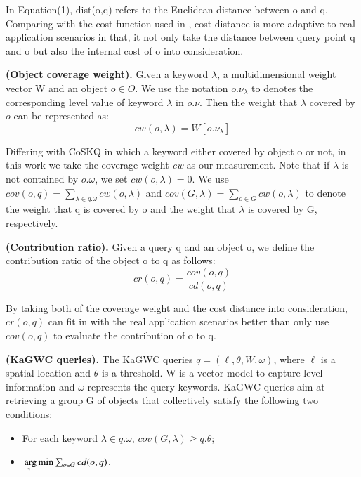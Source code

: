 In Equation(1), dist(o,q) refers to the Euclidean distance between o and q. Comparing with the cost function used in \cite{cao2011collective, long2013collective}, cost distance is more adaptive to real application scenarios in that, it not only take the distance between query point q and o but also the internal cost of o into consideration.

\noindent
\begin{definition}
    \textbf{(Object coverage weight).} Given a keyword $\lambda$, a multidimensional weight vector W and an object $o\in O$. We use the notation $o.\nu_\lambda$ to denotes the corresponding level value of keyword $\lambda$ in $o.\nu$. Then the weight that $\lambda$ covered by $o$ can be represented as:
    \begin{equation}
        cw(o,\lambda)=W[o.\nu_\lambda]
    \end{equation}
\end{definition}

Differing with CoSKQ in which a keyword either covered by object o or not, in this work we take the coverage weight \textit{cw} as our measurement. Note that if $\lambda$ is not contained by $o.\omega$, we set $cw(o,\lambda)=0$. We use $cov(o,q)=\sum_{\lambda \in q.\omega}cw(o,\lambda)$ and $cov(G,\lambda)=\sum_{o \in G}cw(o,\lambda)$ to denote the weight that q is covered by o and the weight that $\lambda$ is covered by G, respectively.

\noindent
\begin{definition}
    \textbf{(Contribution ratio).} Given a query q and an object o, we define the contribution ratio of the object o to q as follows:
    \begin{equation}
        cr(o,q)=\frac{cov(o,q)}{cd(o,q)}
    \end{equation}
\end{definition}

By taking both of the coverage weight and the cost distance into consideration, $cr(o,q)$ can fit in with the real application scenarios better than only use $cov(o,q)$ to evaluate the contribution of o to q.

\noindent
\begin{definition}
    \textbf{(KaGWC queries).} The KaGWC queries $q=(\ell,\theta,W,\omega)$, where $\ell$ is a spatial location and $\theta$ is a threshold. W is a vector model to capture level information and $\omega$ represents the query keywords. KaGWC queries aim at retrieving a group G of objects that collectively satisfy the following two conditions:
    \begin{itemize}
        \item For each keyword $\lambda \in q.\omega$, $cov(G,\lambda)\geq q.\theta$;
        \item $\underaccent{G}{\arg} \min\sum_{o \in G}cd(o,q)$.
    \end{itemize}
\end{definition} \label{D4}

